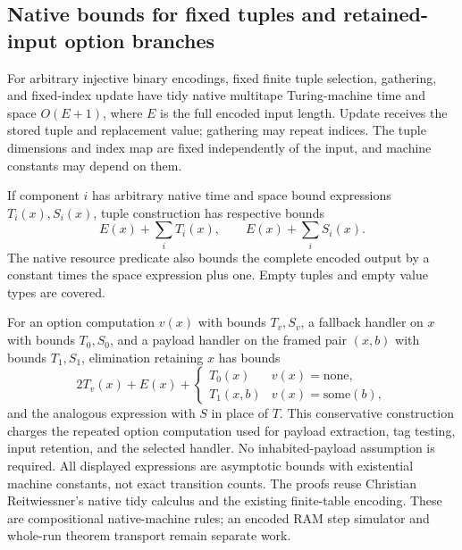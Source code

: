\begin{result}
\subsection{Native bounds for fixed tuples and retained-input option branches}
For arbitrary injective binary encodings, fixed finite tuple selection, gathering, and
fixed-index update have tidy native multitape Turing-machine time and space $O(E+1)$,
where $E$ is the full encoded input length. Update receives the stored tuple and replacement
value; gathering may repeat indices. The tuple dimensions and index map are fixed independently
of the input, and machine constants may depend on them.

If component $i$ has arbitrary native time and space bound expressions $T_i(x),S_i(x)$,
tuple construction has respective bounds
\[
E(x)+\sum_i T_i(x),\qquad E(x)+\sum_i S_i(x).
\]
The native resource predicate also bounds the complete encoded output by a constant times the
space expression plus one. Empty tuples and empty value types are covered.

For an option computation $v(x)$ with bounds $T_v,S_v$, a fallback handler on $x$ with bounds
$T_0,S_0$, and a payload handler on the framed pair $(x,b)$ with bounds $T_1,S_1$, elimination
retaining $x$ has bounds
\[
2T_v(x)+E(x)+
\begin{cases}T_0(x)&v(x)=\mathrm{none},\\T_1(x,b)&v(x)=\mathrm{some}(b),\end{cases}
\]
and the analogous expression with $S$ in place of $T$. This conservative construction charges
the repeated option computation used for payload extraction, tag testing, input retention,
and the selected handler. No inhabited-payload assumption is required. All displayed expressions
are asymptotic bounds with existential machine constants, not exact transition counts.
The proofs reuse Christian Reitwiessner's native tidy calculus and the existing finite-table
encoding. These are compositional native-machine rules; an encoded RAM step simulator and
whole-run theorem transport remain separate work.
\end{result}

